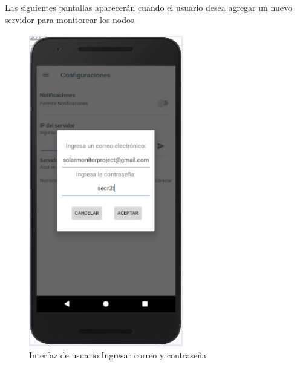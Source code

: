Las siguientes pantallas aparecerán cuando el usuario desea agregar un nuevo servidor para monitorear los nodos. 
\begin{figure}[H]
	\centering
	\includegraphics[scale=0.8]{Capitulo4/software/submodulos/images/man37.png}
	\caption{Interfaz de usuario Ingresar correo y contraseña}
	\label{fig:Correo y contrasena}
\end{figure}

